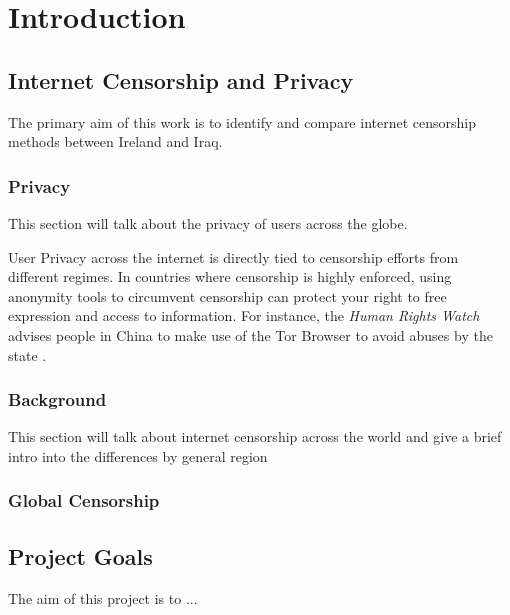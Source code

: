 \chapter{Introduction}

\section{Internet Censorship and Privacy}

The primary aim of this work is to identify and compare internet censorship methods between Ireland and Iraq. 

\subsection{Privacy}
This section will talk about the privacy of users across the globe.

User Privacy across the internet is directly tied to censorship efforts from different regimes. In countries where censorship is highly enforced, using anonymity tools to circumvent censorship can protect your right to free expression and access to information. For instance, the \textit{Human Rights Watch} advises people in China to make use of the Tor Browser to avoid abuses by the state \cite{Privacy2017}. 

\subsection{Background}

This section will talk about internet censorship across the world and give a brief intro into the differences by general region

\subsection{Global Censorship}

\section{Project Goals}

The aim of this project is to ...

